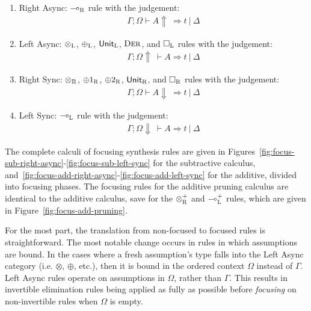 \begin{enumerate}
  \item Right Async: $\multimap_{\textsc{R}}$ rule with the judgement:
        \begin{align*}\Gamma ; \Omega \vdash A \Uparrow\ \Rightarrow t\ |\ \Delta \end{align*}
        \item Left Async:  $\otimes_{\textsc{L}}$, $\oplus_{\textsc{L}}$, $\mathsf{Unit}_{\textsc{L}}$, $\textsc{Der}$, and $\Box_{\textsc{L}}$ rules with the judgement:
        \begin{align*}\Gamma ; \Omega \Uparrow\ \vdash A \Rightarrow t\ |\ \Delta \end{align*}
        \item Right Sync:  $\otimes_{\textsc{R}}$, $\oplus1_{\textsc{R}}$, $\oplus2_{\textsc{R}}$, $\mathsf{Unit}_{\textsc{R}}$, and $\Box_{\textsc{R}}$ rules with the judgement:
        \begin{align*}\Gamma ; \Omega \vdash A \Downarrow\ \Rightarrow t\ |\ \Delta \end{align*}
        \item Left Sync:   $\multimap_{\textsc{L}}$ rule with the judgement:
        \begin{align*}\Gamma ; \Omega \Downarrow\ \vdash A \Rightarrow t\ |\ \Delta \end{align*}
\end{enumerate}

The complete calculi of focusing synthesis rules are given in
Figures~\ref{fig:focus-sub-right-async}-\ref{fig:focus-sub-left-sync} for the
subtractive calculus,
and~\ref{fig:focus-add-right-async}-\ref{fig:focus-add-left-sync} for the
additive, divided into focusing phases. The focusing rules for the additive pruning 
calculus are identical to the additive calculus, save for the $\otimes^{+}_{\textsc{R}}$ and 
$\multimap^{+}_{\textsc{L}}$ rules, which are given in Figure~\ref{fig:focus-add-pruning}.

For the most part, the translation from non-focused to focused rules is
straightforward. The most notable change occurs in rules in which assumptions
are bound. In the cases where a fresh assumption's type falls into the Left
Async category (i.e. $\otimes$, $\oplus$, etc.), then it is bound in the ordered
context $\Omega$ instead of $\Gamma$. Left Async rules operate on assumptions in
$\Omega$, rather than $\Gamma$. This results in invertible elimination rules
being applied as fully as possible before \textit{focusing} on non-invertible
rules when $\Omega$ is empty.  

